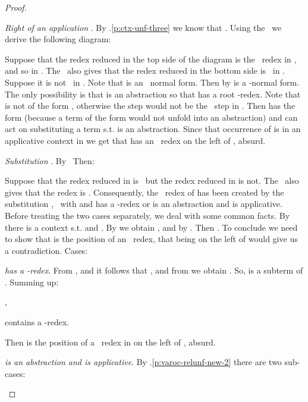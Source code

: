 \begin{proof}
\begin{varenumerate}
\item \emph{Right of an application }. By .\ref{p:ctx-unf-three} we know that . Using the \ih\ we derive the following diagram:		
		\begin{center}
			\commDiagramRed{}{}{}{}{}{}{\unfsym}{\unfsym}
		\end{center}
		Suppose that the redex  reduced in the top side of the diagram is the \lou\ redex in , and so in . The \ih\ also gives that the  redex  reduced in the bottom side is \lo\ in . Suppose it is not \lo\ in . Note that  is an \opt\ normal form. Then by   is a -normal form. The only possibility is that  is an abstraction so that  has a root -redex. Note that  is not of the form , otherwise the step  would not be the \lou\ step in . Then  has the form  (because a term of the form  would not unfold into an abstraction) and  can act on  substituting a term  s.t.  is an abstraction. Since that occurrence of  is in an applicative context in  we get that  has an \opt\ redex on the left of , absurd.

	\item \emph{Substitution }. By \ih\ 
	Then:


	Suppose that the redex  reduced in  is \lo\ but the redex  reduced in  is not. The \ih\ also gives that the redex  is  \lo. Consequently, the \lo\ redex of  has been created by the substitution , \ie\  with  and  has a -redex or  is an abstraction and  is applicative. Before treating the two cases separately, we deal with some common facts. By  there is a context  s.t.  and . By  we obtain , and by  . Then . To conclude we need to show that  is the position of an \opt\ redex, that being on the left of  would give us a contradiction. Cases:
	
	\begin{varenumerate}
		\item \emph{ has a -redex}. From ,  and  it follows that , and from  we obtain . So,  is a subterm of . Summing up:
		\begin{varenumerate}
			\item ,
			\item  contains a -redex.
		\end{varenumerate} 
		
		Then  is the position of a \opt\ redex in  on the left of , absurd.
		
		\item \emph{ is an abstraction and  is applicative}. By .\ref{p:varoc-relunf-new-2} there are two sub-cases:
		

\end{varenumerate}
\end{varenumerate}
\end{proof}
